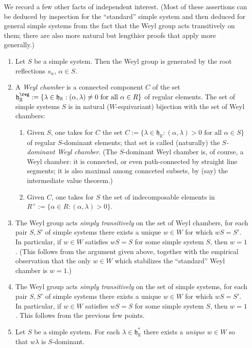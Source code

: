 \documentclass[reqno]{amsart} 
\begin{document}
We record a few other facts of independent interest.  (Most of these assertions can be deduced by inspection for the ``standard'' simple system and then deduced for general simple systems from the fact that the Weyl group acts transitively on them; there are also more natural but lengthier proofs that apply more generally.)
\begin{enumerate}
\item Let $S$ be a simple system.  Then the Weyl group is generated by the root reflections $s_\alpha$, $\alpha \in S$.
\item A \emph{Weyl chamber} is a connected component $C$ of the set $\mathfrak{h}_\mathbb{R}^{\reg} := \{\lambda \in \mathfrak{h}_\mathbb{R}: (\alpha, \lambda ) \neq 0 \text{ for all } \alpha \in R\}$ of regular elements.  The set of simple systems $S$ is in natural ($W$-equivariant) bijection with the set of Weyl chambers:
  \begin{enumerate}
  \item Given $S$, one takes for $C$ the set $C := \{\lambda \in \mathfrak{h}_\mathbb{R} : (\alpha,\lambda) > 0 \text{ for all } \alpha \in S\}$ of regular $S$-dominant elements; that set is called (naturally) the \emph{$S$-dominant Weyl chamber}.  (The $S$-dominant Weyl chamber is, of course, a Weyl chamber: it is connected, or even path-connected by straight line segments; it is also maximal among connceted subsets, by (say) the intermediate value theorem.)
  \item Given $C$, one takes for $S$ the set of indecomposable elements in $R^+ := \{\alpha \in R : (\alpha,\lambda) > 0 \}$.
  \end{enumerate}
\item The Weyl group acts \emph{simply transitively} on the set of Weyl chambers, for each pair $S, S'$ of simple systems there exists a unique $w \in W$ for which $w S = S'$.  In particular, if $w \in W$ satisfies $w S = S$ for some simple system $S$, then $w = 1$.  (This follows from the argument given above, together with the empirical observation that the only $w \in W$ which stabilizes the ``standard'' Weyl chamber is $w = 1$.)
\item The Weyl group acts \emph{simply transitively} on the set of simple systems, for each pair $S, S'$ of simple systems there exists a unique $w \in W$ for which $w S = S'$.  In particular, if $w \in W$ satisfies $w S = S$ for some simple system $S$, then $w = 1$.  This follows from the previous few points.
\item Let $S$ be a simple system.  For each $\lambda \in \mathfrak{h}_\mathbb{R}^*$ there exists a \emph{unique} $w \in W$ so that $w \lambda$ is $S$-dominant.
\end{enumerate}
\end{document}

